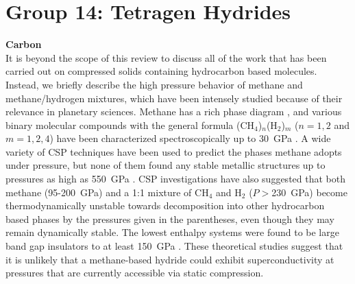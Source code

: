 \documentclass[12pt,letterpaper,oneside]{article}
\begin{document}


\section{Group 14: Tetragen Hydrides} \label{sec:tetragen}


\noindent\textbf{Carbon}\\ 
%
It is beyond the scope of this review to discuss all of the  work that has been carried out on compressed solids containing hydrocarbon based molecules. Instead, we briefly describe the high pressure behavior of methane and methane/hydrogen mixtures, which have been intensely studied because of their relevance in planetary sciences. Methane has a rich phase diagram \cite{Chen:2011-C}, and various binary molecular compounds with the general formula (CH$_4$)$_n$(H$_2$)$_m$ ($n=1,2$ and $m=1,2,4$) have been characterized spectroscopically up to 30~GPa \cite{Somayazulu:1996}. A wide variety  of CSP techniques have been used to predict the phases methane adopts under pressure, but none of them found any stable metallic structures up to pressures as high as 550~GPa \cite{Martinez:2006-C,Gao:2010-C,Juan:2010-C,Lin:2011-C}. CSP investigations have also suggested that both methane \cite{Gao:2010-C,Liu:2016-C} (95-200~GPa) and a 1:1 mixture of CH$_4$ and H$_2$ \cite{Liu:2014-C} ($P >$230~GPa) become thermodynamically unstable towards decomposition into other hydrocarbon based phases by the pressures given in the parentheses, even though they may remain dynamically stable. The lowest enthalpy systems were found to be large band gap insulators to at least 150~GPa \cite{Liu:2014-C}. These theoretical studies suggest that it is unlikely that a methane-based hydride could exhibit superconductivity at pressures that are currently accessible via static compression. \\
\end{document}
